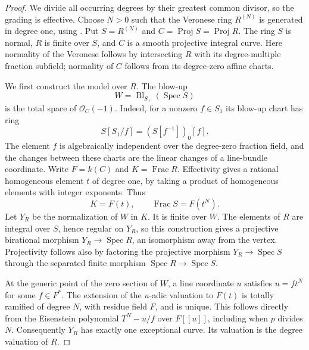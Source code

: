 \begin{proof}
We divide all occurring degrees by their greatest common divisor,
so the grading is effective.  Choose $N>0$ such that the Veronese
ring $R^{(N)}$ is generated in degree one, using
\cite[Lemma 10.56.2, tag 0EGH]{C_StacksWeightedCone}.
Put $S=R^{(N)}$ and $C=\operatorname{Proj}S=\operatorname{Proj}R$.
The ring $S$ is normal, $R$ is finite over $S$, and $C$ is a smooth
projective integral curve.  Here normality of the Veronese follows
by intersecting $R$ with its degree-multiple fraction subfield;
normality of $C$ follows from its degree-zero affine charts.

We first construct the model over $R$.  The blow-up
\[
 W=\operatorname{Bl}_{S_+}(\operatorname{Spec}S)
\]
is the total space of $\mathcal O_C(-1)$.  Indeed, for a nonzero
$f\in S_1$ its blow-up chart has ring
\[
 S[S_1/f]=(S[f^{-1}])_0[f].
\]
The element $f$ is algebraically independent over the degree-zero
fraction field, and the changes between these charts are the
linear changes of a line-bundle coordinate.  Write
$F=k(C)$ and $K=\operatorname{Frac}R$.  Effectivity gives a rational
homogeneous element $t$ of degree one, by taking a product of
homogeneous elements with integer exponents.  Thus
\[
 K=F(t),\qquad \operatorname{Frac}S=F(t^N).
\]
Let $Y_R$ be the normalization of $W$ in $K$.  It is finite over
$W$.  The elements of $R$ are integral over $S$, hence regular
on $Y_R$, so this construction gives a projective birational
morphism $Y_R\to\operatorname{Spec}R$, an isomorphism away from
the vertex.  Projectivity follows also by factoring the projective
morphism $Y_R\to\operatorname{Spec}S$ through the separated finite
morphism $\operatorname{Spec}R\to\operatorname{Spec}S$.

At the generic point of the zero section of $W$, a line coordinate
$u$ satisfies $u=f t^N$ for some $f\in F^*$.  The extension
of the $u$-adic valuation to $F(t)$ is totally ramified of degree
$N$, with residue field $F$, and is unique.  This follows directly
from the Eisenstein polynomial $T^N-u/f$ over $F[[u]]$, including
when $p$ divides $N$.  Consequently $Y_R$ has exactly one
exceptional curve.  Its valuation is the degree valuation of $R$.


\end{proof}
